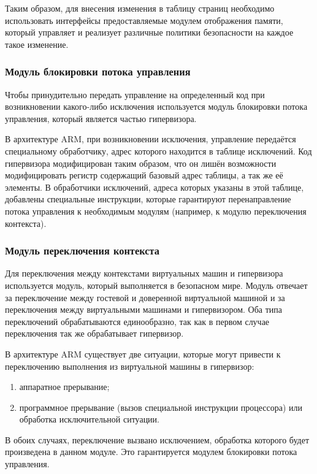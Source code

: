 Таким образом, для внесения изменения в таблицу страниц необходимо использовать интерфейсы предоставляемые модулем отображения памяти, который управляет и реализует различные политики безопасности на каждое такое изменение.

\subsubsection{Модуль блокировки потока управления}

Чтобы принудительно передать управление на определенный код при возникновении какого-либо исключения используется модуль блокировки потока управления, который является частью гипервизора.

В архитектуре ARM, при возникновении исключения, управление передаётся специальному обработчику, адрес которого находится в таблице исключений. Код гипервизора модифицирован таким образом, что он лишён возможности модифицировать регистр содержащий базовый адрес таблицы, а так же её элементы. В обработчики исключений, адреса которых указаны в этой таблице, добавлены специальные инструкции, которые гарантируют перенаправление потока управления к необходимым модулям (например, к модулю переключения контекста).

\subsubsection{Модуль переключения контекста}

Для переключения между контекстами виртуальных машин и гипервизора используется модуль, который выполняется в безопасном мире. Модуль отвечает за переключение между гостевой и доверенной виртуальной машиной и за переключения между виртуальными машинами и гипервизором. Оба типа переключений обрабатываются единообразно, так как в первом случае переключения так же обрабатывает гипервизор.

В архитектуре ARM существует две ситуации, которые могут привести к переключению выполнения из виртуальной машины в гипервизор:

\begin{enumerate}
	\item аппаратное прерывание;
	\item программное прерывание (вызов специальной инструкции процессора) или обработка исключительной ситуации.
\end{enumerate}

В обоих случаях, переключение вызвано исключением, обработка которого будет произведена в данном модуле. Это гарантируется модулем блокировки потока управления.

